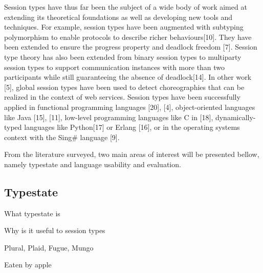 

Session types have thus far been the subject of a wide body of work aimed at extending its theoretical foundations as well as developing new tools and techniques. For example, session types have been augmented with subtyping polymorphism to enable protocols to describe richer behaviours[10]. They have been extended to ensure the progress property and deadlock freedom [7]. Session type theory has also been extended from binary session types to multiparty session types to support communication instances with more than two participants while still guaranteeing the absence of deadlock[14]. In other work [5], global session types have been used to detect choreographies that can be realized in the context of web services.
Session types have been successfully applied in functional programming languages [20], [4], object-oriented languages like Java [15], [11], low-level programming languages like C in [18], dynamically-typed languages like Python[17] or Erlang [16], or in the operating systems context with the Sing\# language [9].


From the literature surveyed, two main areas of interest will be presented bellow, namely typestate and language usability and evaluation.

\subsection{Typestate}

What typestate is 

Why is it useful to session types

Plural, Plaid, Fugue, Mungo

Eaten by apple

